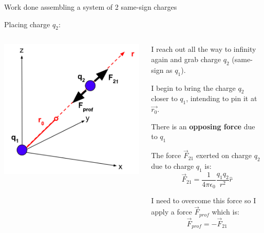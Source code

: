 \begin{frame}{Work done assembling a system of 2 same-sign charges}

Placing charge $q_2$:\\

\begin{columns}
  \begin{column}{0.45\textwidth}
   \begin{center}
     \includegraphics[width=0.99\textwidth]{./images/schematics/work_2_like_charges_2_q1q2.png}\\
   \end{center}
  \end{column}
  \begin{column}{0.55\textwidth}
   \begin{itemize}
   {\small
    \item I reach out all the way to infinity again and grab charge $q_2$ (same-sign as $q_1$).
    \item I begin to bring the charge $q_2$ closer to $q_1$, intending to pin it at $\vec{r_0}$.
    \vspace{0.2cm}
    \item There is an {\bf opposing force} due to $q_1$
    \item The force $\vec{F}_{21}$ exerted on charge $q_2$ due to charge $q_1$ is:
          \begin{equation*}
            \vec{F}_{21} = \frac{1}{4\pi\epsilon_0} \frac{q_1 q_2}{r^2} \hat{r}
          \end{equation*}
    \item I need to overcome this force so I apply a force $\vec{F}_{prof}$ which is:
          \begin{equation*}
            \vec{F}_{prof} = -\vec{F}_{21}
          \end{equation*}
   }
   \end{itemize}
  \end{column}
\end{columns}

\end{frame}


